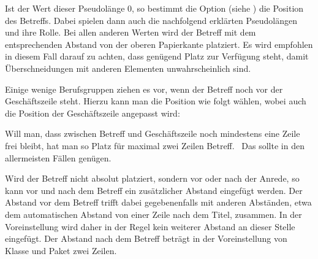 \begin{Declaration}
\end{Declaration}
%
Ist der Wert dieser Pseudolänge 0, so bestimmt die
Option
%
 (siehe
) die
Position des Betreffs. Dabei spielen dann auch die nachfolgend erklärten
Pseudolängen  und  ihre
Rolle. Bei allen anderen Werten wird der Betreff mit dem entsprechenden
Abstand von der oberen Papierkante platziert. Es wird
empfohlen in diesem Fall darauf zu achten, dass genügend Platz zur Verfügung
steht, damit Überschneidungen mit anderen Elementen unwahrscheinlich sind.
\begin{Example}
  Einige wenige Berufsgruppen ziehen es vor, wenn der Betreff noch vor der
  Geschäftszeile steht. Hierzu kann man die Position wie folgt wählen, wobei
  auch die Position der Geschäftszeile angepasst wird:
  Will man, dass zwischen Betreff und Geschäftszeile noch mindestens eine
  Zeile frei bleibt, hat man so Platz für maximal zwei Zeilen Betreff.%
  \iftrue %
  \ Das sollte in den allermeisten Fällen genügen.%
  \fi%
\end{Example}
\EndIndexGroup
\ExampleEndFix


\begin{Declaration}
\end{Declaration}
%
Wird der Betreff nicht absolut platziert, sondern vor oder nach der Anrede, so
kann vor und nach dem Betreff ein zusätzlicher Abstand eingefügt werden. Der
Abstand vor dem Betreff trifft dabei gegebenenfalls mit anderen Abständen,
etwa dem automatischen Abstand von einer Zeile nach dem Titel, zusammen. In
der Voreinstellung wird daher in der Regel kein
weiterer Abstand an dieser Stelle eingefügt. Der Abstand nach dem Betreff
beträgt in der Voreinstellung von Klasse und Paket zwei Zeilen.%
\EndIndexGroup
% 
\EndIndexGroup


